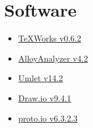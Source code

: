 \section{Software}
\begin{itemize}
\item \href{http://www.tug.org/texworks/}{TeXWorks v0.6.2}
\item \href{http://alloytools.org/}{AlloyAnalyzer v4.2}
\item \href{https://www.umlet.com/}{Umlet v14.2}
\item \href{https://about.draw.io/}{Draw.io v9.4.1}
\item \href{https://proto.io/}{proto.io v6.3.2.3}
\end{itemize}